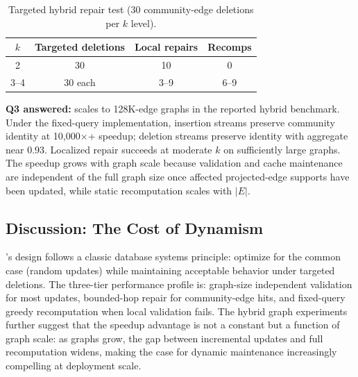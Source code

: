 \begin{table}[htbp]
\centering
\caption{Targeted hybrid repair test (30 community-edge deletions per $k$ level).}
\label{tab:hybrid_repair}
\begin{tabular}{c c c c}
\toprule
$k$ & Targeted deletions & Local repairs & Recomps \\
\midrule
2 & 30 & 10 & 0 \\
3--4 & 30 each & 3--9 & 6--9 \\
\bottomrule
\end{tabular}
\end{table}

\textbf{Q3 answered:} \DynaSCSH scales to 128K-edge graphs in the reported hybrid benchmark. Under the fixed-query implementation, insertion streams preserve community identity at 10,000$\times$+ speedup; deletion streams preserve identity with aggregate \qratio near 0.93. Localized repair succeeds at moderate $k$ on sufficiently large graphs. The speedup grows with graph scale because validation and cache maintenance are independent of the full graph size once affected projected-edge supports have been updated, while static recomputation scales with $|E|$.

\subsection{Discussion: The Cost of Dynamism}

\DynaSCSH's design follows a classic database systems principle: optimize for the common case (random updates) while maintaining acceptable behavior under targeted deletions. The three-tier performance profile is: graph-size independent validation for most updates, bounded-hop repair for community-edge hits, and fixed-query greedy recomputation when local validation fails. The hybrid graph experiments further suggest that the speedup advantage is not a constant but a function of graph scale: as graphs grow, the gap between incremental updates and full recomputation widens, making the case for dynamic maintenance increasingly compelling at deployment scale.
